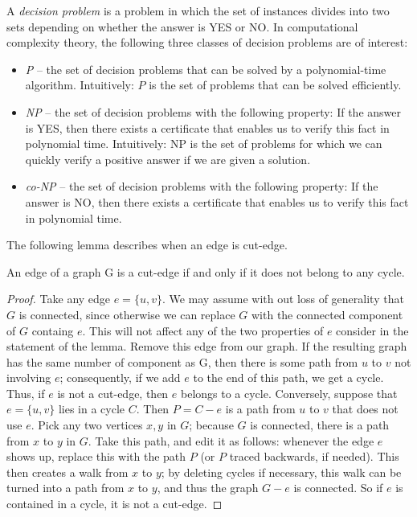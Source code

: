 \documentclass[12pt,a4paper,titlepage,openany]{report}
\begin{document}
A \textit{decision problem} is a problem in which the set of instances divides into two sets depending on whether the answer is YES or NO.
In computational complexity theory, the following three classes of decision problems are of interest:
\begin{itemize}
\item {\it P} -- the set of decision problems that can be solved by a polynomial-time algorithm. Intuitively: $P$ is the set of problems that can be solved efficiently.
\item {\it NP} -- the set of decision problems with the following property:
If the answer is YES, then there exists a certificate that
enables us to verify this fact in polynomial time. Intuitively: NP is the set of problems for which we can
quickly verify a positive answer if we are given a solution.
\item {\it co-NP} -- the set of decision problems with the following property:
If the answer is NO, then there exists a certificate that
enables us to verify this fact in polynomial time.
\end{itemize}
The following lemma describes when an edge is cut-edge.
\begin{lemma}\label{cutedgecycle}
An edge of a graph G is a cut-edge if and only if it does not belong to any cycle.
\end{lemma}
\begin{proof} Take any edge $e = \{u, v\}$. We may assume with out loss of generality that $G$ is connected, since otherwise we can replace $G$ with the connected component of $G$ containg $e$. This will not affect any of the two properties of $e$ consider in the statement of the lemma.  Remove this edge from our graph. If the resulting graph has the same number of component as G, then there is some path from $u$ to $v$ not involving $e$;
consequently, if we add $e$ to the end of this path, we get a cycle. Thus, if $e$ is not a cut-edge, then $e$ belongs to a cycle.\newline
Conversely, suppose that $e = \{u, v\}$ lies in a cycle $C$. Then $P=C-e$ is a path from $u$ to $v$ that does not use $e$. Pick any two vertices $x, y$ in $G$; because $G$ is connected, there is a path from $x$ to $y$ in $G$. Take this path, and edit it as follows:
whenever the edge $e$ shows up, replace this with the path $P$ (or $P$ traced backwards, if needed). This then creates a walk from $x$ to $y$; by deleting cycles if necessary, this walk can be turned into a path from $x$ to $y$, and thus the graph $G-e$ is connected. So if $e$ is contained in a cycle, it is not a cut-edge.
\end{proof}
\end{document}
